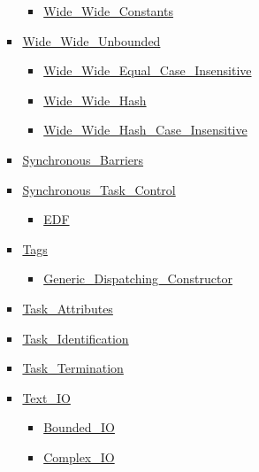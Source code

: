 \documentclass[english]{article}
\begin{document}
\begin{scriptsize}
\begin{multicols*}{5}
\begin{itemize}[leftmargin=0mm]
\begin{itemize}[leftmargin=5mm]
\begin{itemize}[leftmargin=5mm]
\begin{itemize}[leftmargin=5mm]
	  \item[] \href{http://www.ada-auth.org/standards/22rm/html/RM-A-4-8.html}{Wide\_Wide\_Constants}
	  \end{itemize}
	\item[] \href{http://www.ada-auth.org/standards/22rm/html/RM-A-4-8.html}{Wide\_Wide\_Unbounded}
	  \begin{itemize}[leftmargin=5mm]
	  \item[] \href{http://www.ada-auth.org/standards/22rm/html/RM-A-4-8.html}{Wide\_Wide\_Equal\_Case\_Insensitive}
	  \item[] \href{http://www.ada-auth.org/standards/22rm/html/RM-A-4-8.html}{Wide\_Wide\_Hash}
	  \item[] \href{http://www.ada-auth.org/standards/22rm/html/RM-A-4-8.html}{Wide\_Wide\_Hash\_Case\_Insensitive}
	  \end{itemize}
	\item[] \href{http://www.ada-auth.org/standards/22rm/html/RM-D-10-1.html}{Synchronous\_Barriers}
	\item[] \href{http://www.ada-auth.org/standards/22rm/html/RM-D-10.html}{Synchronous\_Task\_Control}
	  \begin{itemize}[leftmargin=5mm]
	  \item[] \href{http://www.ada-auth.org/standards/22rm/html/RM-D-10.html}{EDF}
	  \end{itemize}
	\item[] \href{http://www.ada-auth.org/standards/22rm/html/RM-3-9.html}{Tags}
	  \begin{itemize}[leftmargin=5mm]
	  \item[] \href{http://www.ada-auth.org/standards/22rm/html/RM-3-9.html}{Generic\_Dispatching\_Constructor}
	  \end{itemize}
	\item[] \href{http://www.ada-auth.org/standards/22rm/html/RM-C-7-2.html}{Task\_Attributes}
	\item[] \href{http://www.ada-auth.org/standards/22rm/html/RM-C-7-1.html}{Task\_Identification}
	\item[] \href{http://www.ada-auth.org/standards/22rm/html/RM-C-7-3.html}{Task\_Termination}
	\item[] \href{http://www.ada-auth.org/standards/22rm/html/RM-A-10-1.html}{Text\_IO}
	  \begin{itemize}[leftmargin=5mm]
	  \item[] \href{http://www.ada-auth.org/standards/22rm/html/RM-A-10-11.html}{Bounded\_IO}
	  \item[] \href{http://www.ada-auth.org/standards/22rm/html/RM-G-1-3.html}{Complex\_IO}

\end{itemize}
\end{itemize}
\end{itemize}
\end{itemize}
\end{multicols*}
\end{scriptsize}
\end{document}
